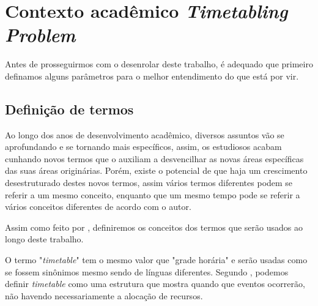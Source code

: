 \chapter{Contexto acadêmico \textit{Timetabling Problem}} %

Antes de prosseguirmos com o desenrolar deste trabalho, é adequado que primeiro definamos alguns parâmetros para o melhor entendimento do que está por vir.


\section{Definição de termos} %

    Ao longo dos anos de desenvolvimento acadêmico, diversos assuntos vão se aprofundando e se tornando mais específicos, assim, os estudiosos acabam cunhando novos termos que o auxiliam a desvencilhar as novas áreas específicas das suas áreas originárias. Porém, existe o potencial de que haja um crescimento desestruturado destes novos termos, assim vários termos diferentes podem se referir a um mesmo conceito, enquanto que um mesmo tempo pode se referir a vários conceitos diferentes de acordo com o autor.

    Assim como feito por \cite{goos_scheduling_1996}, definiremos os conceitos dos termos que serão usados ao longo deste trabalho.

    O termo "\textit{timetable}" tem o mesmo valor que "grade horária" e serão usadas como se fossem sinônimos mesmo sendo de línguas diferentes. Segundo \cite{goos_scheduling_1996}, podemos definir \textit{timetable} como uma estrutura que mostra quando que eventos ocorrerão, não havendo necessariamente a alocação de recursos.

